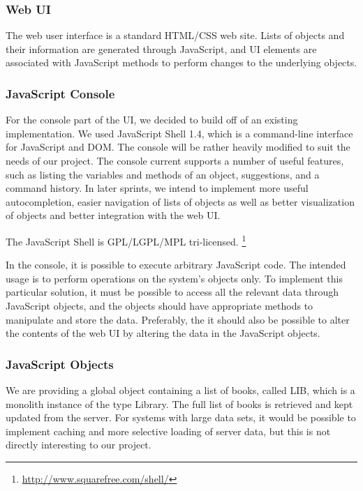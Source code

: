 \subsubsection{Web UI}
The web user interface is a standard HTML/CSS web site. Lists of objects and their information are generated through JavaScript, and UI elements are associated with JavaScript methods to perform changes to the underlying objects.

\subsubsection{JavaScript Console}
For the console part of the UI, we decided to build off of an existing implementation. We used JavaScript Shell 1.4, which is a command-line interface for JavaScript and DOM. The console will be rather heavily modified to suit the needs of our project. The console current supports a number of useful features, such as listing the variables and methods of an object, suggestions, and a command history. In later sprints, we intend to implement more useful autocompletion, easier navigation of lists of objects as well as better visualization of objects and better integration with the web UI.

The JavaScript Shell is GPL/LGPL/MPL tri-licensed. 
\footnote{\url{http://www.squarefree.com/shell/}}

In the console, it is possible to execute arbitrary JavaScript code. The intended usage is to perform operations on the system's objects only. To implement this particular solution, it must be possible to access all the relevant data through JavaScript objects, and the objects should have appropriate methods to manipulate and store the data. Preferably, the it should also be possible to alter the contents of the web UI by altering the data in the JavaScript objects.

\subsubsection{JavaScript Objects}
We are providing a global object containing a list of books, called LIB, which is a monolith instance of the type Library. The full list of books is retrieved and kept updated from the server. For systems with large data sets, it would be possible to implement caching and more selective loading of server data, but this is not directly interesting to our project. 

